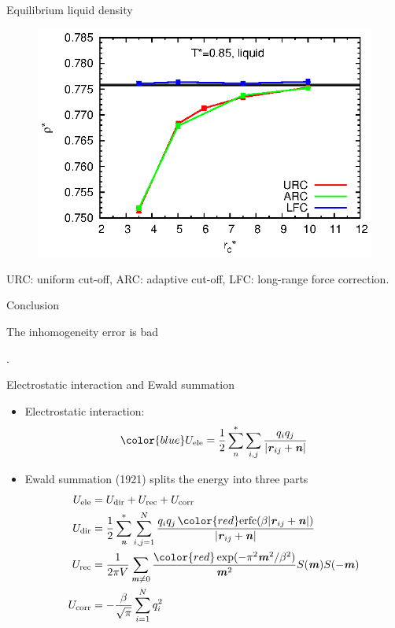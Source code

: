 \documentclass{beamer}
\newcommand{\redc}[1]{{\color{red} #1}}
\newcommand{\bluec}[1]{{\color{blue} #1}}
\renewcommand{\v}[1]{\textbf{\textit{#1}}}
\begin{document}
\begin{frame}{Equilibrium liquid density}
  \begin{figure}
    \centering
    \includegraphics[]{figs/converge.new/t0p85-liquid.eps} 
  \end{figure}
  URC: uniform cut-off, ARC: adaptive cut-off, LFC: long-range force correction.
\end{frame}


\begin{frame}{Conclusion}
  \centerline{\redc{The inhomogeneity error is bad}}.
\end{frame}

\begin{frame}{Electrostatic interaction and Ewald summation}
  \begin{itemize}
  \item<1->   Electrostatic interaction:
  \begin{equation*}\bluec{
    U_{\textrm{ele}} = \frac12 \sum^\ast_{n}\sum_{i,j}\frac{q_i q_j}{\vert \v r_{ij} + \v n\vert}}
  \end{equation*}
\item <2->
  Ewald summation (1921) splits the
  energy into three parts
  \bluec{
  \begin {align*}
    U_{\textrm{ele}} &=  U_{\textrm{dir}} + U_{\textrm{rec}}+ U_{\textrm{corr}}\\
    U_{\textrm{dir}} & = \frac12 \sum^{\ast}_{\v n}
    \sum_{i,j = 1}^{N} \frac{q_iq_j\, \redc{\textrm{erfc}(\beta \vert\v{r}_{ij} + \v{n}\vert)}}
    {\vert\v{r}_{ij} + \v{n}\vert} \\ \label{Erec-ewald}
    U_{\textrm{rec}} & = \frac1{2\pi V} \sum_{\v m \neq 0}
    \frac{\redc{\exp(-\pi^2\v m^2 / \beta^2)}}{\v m^2} S(\v m) S(-\v m) \\
    U_{\textrm{corr}}& = -\frac\beta{\sqrt \pi} \sum_{i=1}^N q_i^2
  \end {align*}}
  \end{itemize}
\end{frame}
\end{document}
